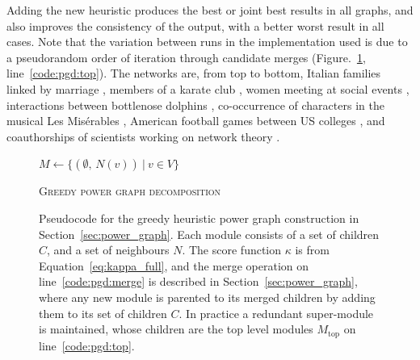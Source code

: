 Adding the new heuristic produces the best or joint best results in all graphs, and also improves the consistency of the output, with a better worst result in all cases.
Note that the variation between runs in the implementation used is due to a pseudorandom order of iteration through
candidate merges (Figure.~\ref{fig:pseudo_pgd}, line~\ref{code:pgd:top}).
The networks are, from top to bottom, Italian families linked by marriage \cite{Breiger1986}, members of a karate club \cite{Zachary1977}, women meeting at social events \cite{Davis2009}, interactions between bottlenose dolphins \cite{Lusseau2003}, co-occurrence of characters in the musical Les Mis\'erables \cite{Knuth1993}, American football games between US colleges \cite{Girvan2002}, and coauthorships of scientists working on network theory \cite{Newman2006Eigenvectors}.
 
\begin{figure}
  \removeAlgorithmFigureError
  \DontPrintSemicolon
  \begin{algorithm}[H]
    
    $M \leftarrow \{(\emptyset,\,N(v))\ |\ v\in V\}$
    
    \caption{\textsc{Greedy power graph decomposition}}
    \label{alg:pgd}
  \end{algorithm}
  
  \caption[Pseudocode for improved power graph decomposition]{Pseudocode for the greedy heuristic power graph construction in Section~\ref{sec:power_graph}.
  Each module consists of a set of children $C$, and a set of neighbours $N$.
  The score function $\kappa$ is from Equation~\eqref{eq:kappa_full}, and the merge operation on line~\ref{code:pgd:merge} is described in Section~\ref{sec:power_graph}, where any new module is parented to its merged children by adding them to its set of children $C$.
  In practice a redundant super-module is maintained, whose children are the top level modules $M_\mathrm{top}$ on line~\ref{code:pgd:top}.}
  \label{fig:pseudo_pgd}
\end{figure} 

